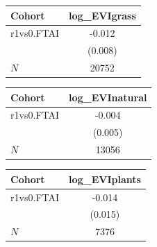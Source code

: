 {
\def\sym#1{\ifmmode^{#1}\else\(^{#1}\)\fi}
\begin{tabular}{l*{1}{c}}
\toprule
Cohort    &log\_EVIgrass   \\
\midrule
r1vs0.FTAI&   -0.012   \\
          &  (0.008)   \\
\midrule
\(N\)     &    20752   \\
\bottomrule
\end{tabular}
}
{
\def\sym#1{\ifmmode^{#1}\else\(^{#1}\)\fi}
\begin{tabular}{l*{1}{c}}
\toprule
Cohort    &log\_EVInatural   \\
\midrule
r1vs0.FTAI&   -0.004   \\
          &  (0.005)   \\
\midrule
\(N\)     &    13056   \\
\bottomrule
\end{tabular}
}
{
\def\sym#1{\ifmmode^{#1}\else\(^{#1}\)\fi}
\begin{tabular}{l*{1}{c}}
\toprule
Cohort    &log\_EVIplants   \\
\midrule
r1vs0.FTAI&   -0.014   \\
          &  (0.015)   \\
\midrule
\(N\)     &     7376   \\
\bottomrule
\end{tabular}
}
